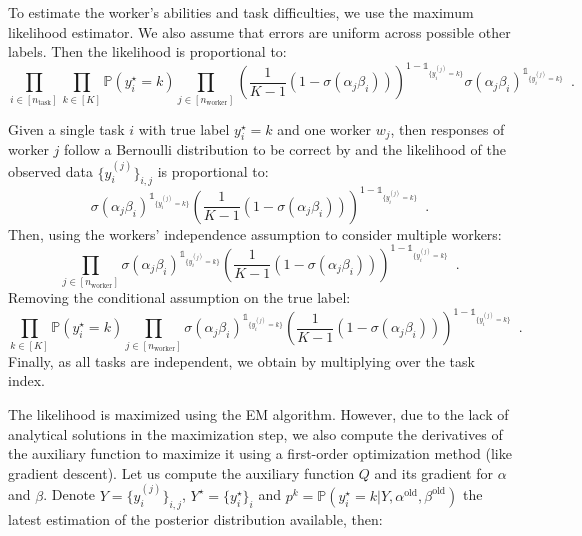 To estimate the worker's abilities and task difficulties, we use the maximum likelihood estimator.
We also assume that errors are uniform across possible other labels.
Then the likelihood is proportional to:
\begin{equation}\label{eq:likelihood_glad}
    \prod_{i\in[n_\text{task}]} \prod_{k\in[K]}\mathbb{P}(y_i^\star=k)\prod_{j\in [n_\text{worker}]} \left(\frac{1}{K-1}\left(1-\sigma(\alpha_j\beta_i)\right)\right)^{1-\mathds{1}_{\{y_i^{(j)}=k\}}}\sigma(\alpha_j\beta_i)^{\mathds{1}_{\{y_i^{(j)}=k\}}} \enspace.
\end{equation}

\begin{constructionbox}
Given a single task $i$ with true label $y_i^\star=k$ and one worker $w_j$, then responses of worker $j$ follow a Bernoulli distribution to be correct by  and the likelihood of the observed data $\{y_i^{(j)}\}_{i,j}$ is proportional to:
\begin{equation*}
    \sigma(\alpha_j\beta_i)^{\mathds{1}_{\{y_i^{(j)}=k\}}}\left(\frac{1}{K-1}\left(1-\sigma(\alpha_j\beta_i)\right)\right)^{1-\mathds{1}_{\{y_i^{(j)}=k\}}}\enspace.
\end{equation*}
Then, using the workers' independence assumption to consider multiple workers:
\begin{equation*}
    \prod_{j\in [n_{\text{worker}}]}   \sigma(\alpha_j\beta_i)^{\mathds{1}_{\{y_i^{(j)}=k\}}}\left(\frac{1}{K-1}\left(1-\sigma(\alpha_j\beta_i)\right)\right)^{1-\mathds{1}_{\{y_i^{(j)}=k\}}} \enspace.
\end{equation*}
Removing the conditional assumption on the true label:
\begin{equation*}
    \prod_{k\in[K]}\mathbb{P}(y_i^\star=k)\prod_{j\in [n_{\text{worker}}]} \sigma(\alpha_j\beta_i)^{\mathds{1}_{\{y_i^{(j)}=k\}}}\left(\frac{1}{K-1}\left(1-\sigma(\alpha_j\beta_i)\right)\right)^{1-\mathds{1}_{\{y_i^{(j)}=k\}}} \enspace.
\end{equation*}
Finally, as all tasks are independent, we obtain  by multiplying over the task index.
\end{constructionbox}

The likelihood is maximized using the EM algorithm.
However, due to the lack of analytical solutions in the maximization step, we also compute the derivatives of the auxiliary function to maximize it using a first-order optimization method (like gradient descent).
Let us compute the auxiliary function $Q$ and its gradient for $\alpha$ and $\beta$. Denote $Y=\{y_i^{(j)}\}_{i,j}$, $Y^\star=\{y_i^\star\}_i$ and $p^k=\mathbb{P}(y_i^\star=k|Y,\alpha^\text{old},\beta^\text{old})$ the latest estimation of the posterior distribution available, then:

